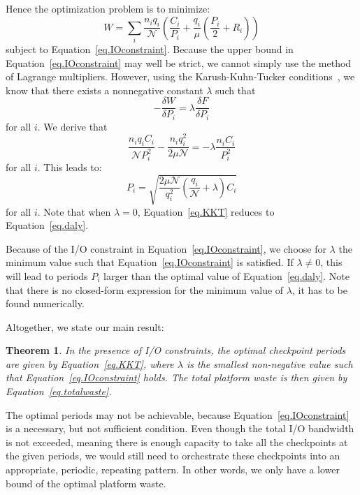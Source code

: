 \documentclass[two]{article}
\newtheorem{theorem}{Theorem}
\newcommand{\nbnodesplat}{{\mathcal N}}
\newcommand{\nbapp}[1]{n_{#1}}
\newcommand{\nbnodes}[1]{q_{#1}}
\newcommand{\period}[1]{P_{#1}}
\newcommand{\ckpt}[1]{C_{#1}}
\newcommand{\reco}[1]{R_{#1}}
\newcommand{\mtbfplat}{\mu}
\newcommand{\wasteplat}{W}
\newcommand{\ioconstraint}{F}
\begin{document}
Hence the optimization problem is to minimize:
\begin{equation}
\wasteplat = \sum_i \frac{\nbapp{i} \nbnodes{i}}{\nbnodesplat}  \left( \frac{\ckpt{i}}{\period{i}} +
\frac{\nbnodes{i}}{\mtbfplat}(\frac{\period{i}}{2} + \reco{i}) \right)
\label{eq.totalwaste}
\end{equation}
subject to Equation~\eqref{eq.IOconstraint}.
Because the upper bound in Equation~\eqref{eq.IOconstraint} may well be strict, we cannot simply use 
the method of Lagrange multipliers. However, 
using the Karush-Kuhn-Tucker conditions~\cite{Boyd2004}, we know that there exists a nonnegative constant
$\lambda$
such that
$$- \frac{\delta \wasteplat}{\delta \period{i}} = \lambda \frac{\delta \ioconstraint}{\delta \period{i}}$$
for all $i$. We derive that
$$\frac{\nbapp{i} \nbnodes{i} \ckpt{i}}{\nbnodesplat \period{i}^{2}} -    \frac{\nbapp{i} \nbnodes{i}^{2}}{2 \mtbfplat \nbnodesplat} = - \lambda \frac{\nbapp{i} \ckpt{i}}{\period{i}^{2}}
$$
for all $i$. This leads to:
 \begin{equation}
\period{i} = \sqrt{\frac{2 \mtbfplat  \nbnodesplat}{\nbnodes{i}^{2}} \left(\frac{\nbnodes{i}}{\nbnodesplat} +\lambda \right) \ckpt{i}}
  \label{eq.KKT}
\end{equation}
for all $i$. Note that when $\lambda=0$, Equation~\eqref{eq.KKT} reduces to Equation~\eqref{eq.daly}.

Because of the I/O constraint in Equation~\eqref{eq.IOconstraint}, we choose
for $\lambda$ the minimum value such that Equation~\eqref{eq.IOconstraint} is
satisfied. If $\lambda \neq 0$, this will lead to periods $P_{i}$ larger than
the optimal value of Equation~\eqref{eq.daly}. Note that there is no
closed-form expression for the minimum value of $\lambda$, it has to be found
numerically.

Altogether, we state our main result:

\begin{theorem}
     In the presence of I/O constraints, the optimal checkpoint periods are given by
     Equation~\eqref{eq.KKT}, where $\lambda$ is the smallest non-negative value such
     that Equation~\eqref{eq.IOconstraint} holds. The total platform waste is then
     given by Equation~\eqref{eq.totalwaste}.
\end{theorem}

The optimal periods may not be achievable, because
Equation~\eqref{eq.IOconstraint} is a necessary, but not sufficient condition.
Even though the total I/O bandwidth is not exceeded, meaning there is enough
capacity to take all the checkpoints at the given periods, we would still need
to orchestrate these checkpoints into an appropriate, periodic, repeating
pattern.  In other words, we only have a lower bound of the optimal platform
waste.
\end{document}
